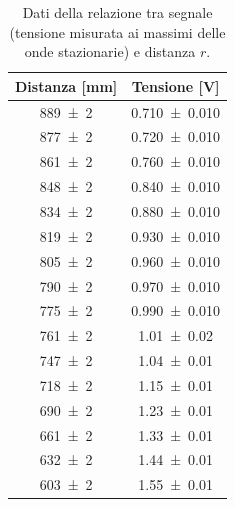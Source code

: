 \documentclass[a4paper]{article}
\begin{document}
\begin{table}[htbp]
\centering
\caption{Dati della relazione tra segnale (tensione misurata ai massimi delle onde stazionarie) e distanza $r$.}
\label{tab:dati_ampgeom_massimi_distanza}
\begin{tabular}{|c|c|}
\hline
Distanza [\si{\milli\metre}] & Tensione [\si{\volt}] \\\hline\hline
\num{889 \pm 2} & \num{0.710 \pm 0.010} \\
\num{877 \pm 2} & \num{0.720 \pm 0.010} \\
\num{861 \pm 2} & \num{0.760 \pm 0.010} \\
\num{848 \pm 2} & \num{0.840 \pm 0.010} \\
\num{834 \pm 2} & \num{0.880 \pm 0.010} \\
\num{819 \pm 2} & \num{0.930 \pm 0.010} \\
\num{805 \pm 2} & \num{0.960 \pm 0.010} \\
\num{790 \pm 2} & \num{0.970 \pm 0.010} \\
\num{775 \pm 2} & \num{0.990 \pm 0.010} \\
\num{761 \pm 2} & \num{1.01 \pm 0.02} \\
\num{747 \pm 2} & \num{1.04 \pm 0.01} \\
\num{718 \pm 2} & \num{1.15 \pm 0.01} \\
\num{690 \pm 2} & \num{1.23 \pm 0.01} \\
\num{661 \pm 2} & \num{1.33 \pm 0.01} \\
\num{632 \pm 2} & \num{1.44 \pm 0.01} \\
\num{603 \pm 2} & \num{1.55 \pm 0.01} \\
\hline
\end{tabular}
\end{table}
\end{document}
